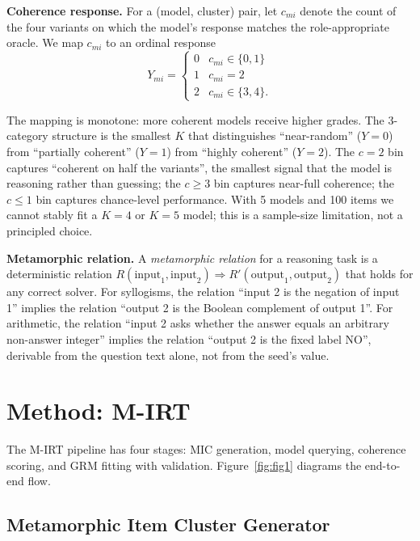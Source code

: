 \documentclass[11pt,letterpaper]{article}
\begin{document}
\textbf{Coherence response.} For a (model, cluster) pair, let $c_{mi}$ denote the count of the four variants on which the model's response matches the role-appropriate oracle. We map $c_{mi}$ to an ordinal response
\begin{equation}
Y_{mi} = \begin{cases} 0 & c_{mi} \in \{0, 1\} \\ 1 & c_{mi} = 2 \\ 2 & c_{mi} \in \{3, 4\}. \end{cases}
\end{equation}

The mapping is monotone: more coherent models receive higher grades. The 3-category structure is the smallest $K$ that distinguishes ``near-random'' ($Y = 0$) from ``partially coherent'' ($Y = 1$) from ``highly coherent'' ($Y = 2$). The $c = 2$ bin captures ``coherent on half the variants'', the smallest signal that the model is reasoning rather than guessing; the $c \geq 3$ bin captures near-full coherence; the $c \leq 1$ bin captures chance-level performance. With 5 models and 100 items we cannot stably fit a $K = 4$ or $K = 5$ model; this is a sample-size limitation, not a principled choice.

\textbf{Metamorphic relation.} A \emph{metamorphic relation} \citep{Chen2018} for a reasoning task is a deterministic relation $R(\mathrm{input}_1, \mathrm{input}_2) \Rightarrow R'(\mathrm{output}_1, \mathrm{output}_2)$ that holds for any correct solver. For syllogisms, the relation ``input 2 is the negation of input 1'' implies the relation ``output 2 is the Boolean complement of output 1''. For arithmetic, the relation ``input 2 asks whether the answer equals an arbitrary non-answer integer'' implies the relation ``output 2 is the fixed label NO'', derivable from the question text alone, not from the seed's value.

\section{Method: M-IRT}
\label{sec:method}

The M-IRT pipeline has four stages: MIC generation, model querying, coherence scoring, and GRM fitting with validation. Figure~\ref{fig:fig1} diagrams the end-to-end flow.

\subsection{Metamorphic Item Cluster Generator}
\end{document}
